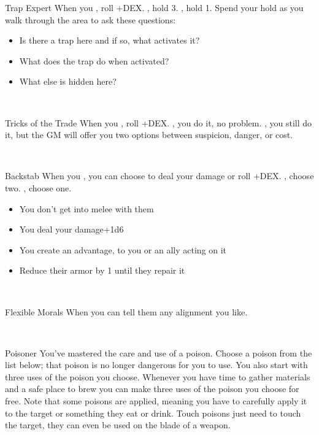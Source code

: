 \documentclass[8pt]{extarticle}
\begin{document}
\begin{minipage}[t]{4.6in}



\begin{basicmove}{Trap Expert}
  When you , roll
  +DEX. \onSuccess, hold 3. \onPartial, hold 1. Spend your hold as you
  walk through the area to ask these questions:

  \begin{itemize}
  \item Is there a trap here and if so, what activates it?
  \item What does the trap do when activated?
  \item What else is hidden here?
  \end{itemize}
\end{basicmove}
\

\begin{basicmove}{Tricks of the Trade}
  When you , roll
  +DEX. \onSuccess, you do it, no problem. \onPartial, you still do
  it, but the GM will offer you two options between suspicion, danger,
  or cost.
\end{basicmove}
\

\begin{basicmove}{Backstab}
  When you , you can choose to deal your damage or
  roll +DEX. \onSuccess, choose two. \onPartial, choose one.

  \begin{itemize}
  \item You don’t get into melee with them
  \item You deal your damage+1d6
  \item You create an advantage,  to you or an ally acting
    on it
  \item Reduce their armor by 1 until they repair it
  \end{itemize}

\end{basicmove}
\


\begin{basicmove}{Flexible Morals}
  When  you can tell
  them any alignment you like.
\end{basicmove}
\

\begin{basicmove}{Poisoner}
  You’ve mastered the care and use of a poison. Choose a poison from
  the list below; that poison is no longer dangerous for you to
  use. You also start with three uses of the poison you
  choose. Whenever you have time to gather materials and a safe place
  to brew you can make three uses of the poison you choose for
  free. Note that some poisons are applied, meaning you have to
  carefully apply it to the target or something they eat or
  drink. Touch poisons just need to touch the target, they can even be
  used on the blade of a weapon.


\end{basicmove}
\end{minipage}
\end{document}
